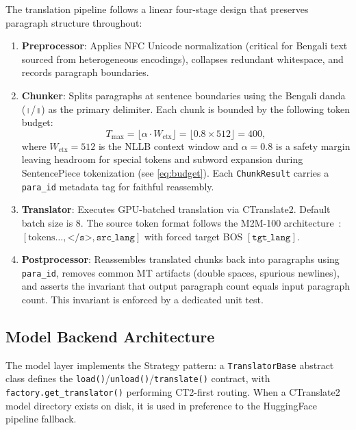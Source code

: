 \documentclass[conference]{IEEEtran}
\begin{document}
The translation pipeline follows a linear four-stage design that preserves paragraph
structure throughout:

\begin{enumerate}
  \item \textbf{Preprocessor}: Applies NFC Unicode normalization (critical for Bengali
        text sourced from heterogeneous encodings), collapses redundant whitespace, and
        records paragraph boundaries.

  \item \textbf{Chunker}: Splits paragraphs at sentence boundaries using the Bengali
        danda (\texttt{।}/\texttt{॥}) as the primary delimiter. Each chunk is bounded
        by the following token budget:
        \begin{equation}
          T_{\max} = \lfloor \alpha \cdot W_{\mathrm{ctx}} \rfloor = \lfloor 0.8 \times 512 \rfloor = 400,
          \label{eq:budget}
        \end{equation}
        where $W_{\mathrm{ctx}} = 512$ is the NLLB context window and $\alpha = 0.8$
        is a safety margin leaving headroom for special tokens and subword expansion
        during SentencePiece tokenization (see \eqref{eq:budget}).
        Each \texttt{ChunkResult} carries a \texttt{para\_id} metadata tag for
        faithful reassembly.

  \item \textbf{Translator}: Executes GPU-batched translation via CTranslate2.
        Default batch size is 8. The source token format follows the M2M-100
        architecture~\cite{fan2021beyond}:
        $[\text{tokens}\ldots, \texttt{</s>}, \texttt{src\_lang}]$
        with forced target BOS $[\texttt{tgt\_lang}]$.

  \item \textbf{Postprocessor}: Reassembles translated chunks back into paragraphs
        using \texttt{para\_id}, removes common MT artifacts (double spaces, spurious
        newlines), and asserts the invariant that output paragraph count equals input
        paragraph count. This invariant is enforced by a dedicated unit test.
\end{enumerate}

\subsection{Model Backend Architecture}

The model layer implements the Strategy pattern: a \texttt{TranslatorBase} abstract
class defines the \texttt{load()}/\texttt{unload()}/\texttt{translate()} contract,
with \texttt{factory.get\_translator()} performing CT2-first routing.
When a CTranslate2 model directory exists on disk, it is used in preference to the
HuggingFace pipeline fallback.
\end{document}
